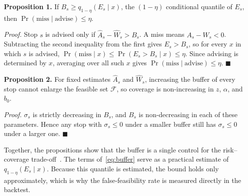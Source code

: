\textbf{Proposition 1.} If $B_s \ge q_{1-\eta}(E_s \mid x)$, the $(1-\eta)$ conditional quantile of $E_s$, then $\Pr(\text{miss} \mid \text{advise}) \le \eta$.

\emph{Proof.} Stop $s$ is advised only if $\hat{A}_s - \hat{W}_s > B_s$. A miss means $A_s - W_s < 0$. Subtracting the second inequality from the first gives $E_s > B_s$, so for every $x$ in which $s$ is advised, $\Pr(\text{miss} \mid x) \le \Pr(E_s > B_s \mid x) \le \eta$. Since advising is determined by $x$, averaging over all such $x$ gives $\Pr(\text{miss} \mid \text{advise}) \le \eta$. \hfill$\blacksquare$

\textbf{Proposition 2.} For fixed estimates $\hat{A}_s$ and $\hat{W}_s$, increasing the buffer of every stop cannot enlarge the feasible set $\mathcal{F}$, so coverage is non-increasing in $z$, $\alpha$, and $b_0$.

\emph{Proof.} $\sigma_s$ is strictly decreasing in $B_s$, and $B_s$ is non-decreasing in each of these parameters. Hence any stop with $\sigma_s \le 0$ under a smaller buffer still has $\sigma_s \le 0$ under a larger one. \hfill$\blacksquare$

Together, the propositions show that the buffer is a single control for the risk--coverage trade-off~\cite{geifman2017}. The terms of~\eqref{eq:buffer} serve as a practical estimate of $q_{1-\eta}(E_s \mid x)$. Because this quantile is estimated, the bound holds only approximately, which is why the false-feasibility rate is measured directly in the backtest.
